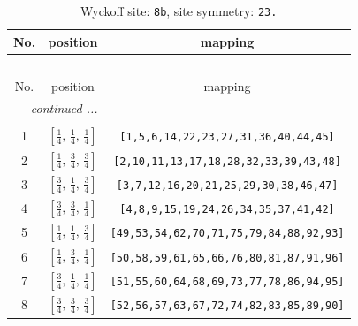 \documentclass[fleqn,8pt]{jsarticle}
\begin{document}
\begin{longtable}{ccc}
\caption{Wyckoff site: {\tt 8b}, site symmetry: {\tt 23.}}
 \\
 \hline \hline
No. & position & mapping \\ \hline \endfirsthead

\multicolumn{2}{l}{\tablename\ \thetable{}} \\
 \hline \hline
No. & position & mapping \\ \hline \endhead

 \hline \hline
\multicolumn{2}{r}{\footnotesize\it continued ...} \\ \endfoot

 \hline \hline
\multicolumn{2}{r}{} \\ \endlastfoot

1 & $\left[ \frac{1}{4},\, \frac{1}{4},\, \frac{1}{4} \right]$ & {\tt [1,5,6,14,22,23,27,31,36,40,44,45]} \\ \hline
2 & $\left[ \frac{1}{4},\, \frac{3}{4},\, \frac{3}{4} \right]$ & {\tt [2,10,11,13,17,18,28,32,33,39,43,48]} \\ \hline
3 & $\left[ \frac{3}{4},\, \frac{1}{4},\, \frac{3}{4} \right]$ & {\tt [3,7,12,16,20,21,25,29,30,38,46,47]} \\ \hline
4 & $\left[ \frac{3}{4},\, \frac{3}{4},\, \frac{1}{4} \right]$ & {\tt [4,8,9,15,19,24,26,34,35,37,41,42]} \\ \hline
5 & $\left[ \frac{1}{4},\, \frac{1}{4},\, \frac{3}{4} \right]$ & {\tt [49,53,54,62,70,71,75,79,84,88,92,93]} \\ \hline
6 & $\left[ \frac{1}{4},\, \frac{3}{4},\, \frac{1}{4} \right]$ & {\tt [50,58,59,61,65,66,76,80,81,87,91,96]} \\ \hline
7 & $\left[ \frac{3}{4},\, \frac{1}{4},\, \frac{1}{4} \right]$ & {\tt [51,55,60,64,68,69,73,77,78,86,94,95]} \\ \hline
8 & $\left[ \frac{3}{4},\, \frac{3}{4},\, \frac{3}{4} \right]$ & {\tt [52,56,57,63,67,72,74,82,83,85,89,90]} \\
\end{longtable}
\renewcommand{\arraystretch}{1.2}
\end{document}
